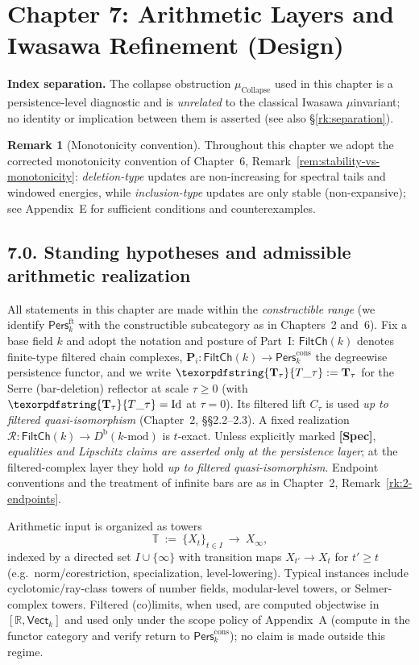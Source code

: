 \documentclass[11pt]{article}
\DeclareRobustCommand{\hyp}{\nobreakdash-}
\newcommand{\Pers}{\mathsf{Pers}}
\newcommand{\Rfun}{\mathcal{R}}
\numberwithin{equation}{section}
\theoremstyle{definition}
\newtheorem{remark}[theorem]{Remark}
\DeclareRobustCommand{\FiltCh}[1]{\mathsf{FiltCh}(#1)}
\DeclareRobustCommand{\Ttau}{\texorpdfstring{\ensuremath{\mathbf{T}_{\tau}}}{T\_\tau}}
\DeclareRobustCommand{\muc}{\mu_{\mathrm{Collapse}}}
\begin{document}
\section{Chapter 7: Arithmetic Layers and Iwasawa Refinement (Design)}

\noindent\textbf{Index separation.} The collapse obstruction \(\muc\) used in this chapter is a persistence\hyp level diagnostic and is \emph{unrelated} to the classical Iwasawa \(\mu\)\nobreakdash invariant; no identity or implication between them is asserted (see also §\ref{rk:separation}).

\begin{remark}[Monotonicity convention]
Throughout this chapter we adopt the corrected monotonicity convention of
Chapter~6, Remark~\ref{rem:stability-vs-monotonicity}:
\emph{deletion\hyp type} updates are non\hyp increasing for spectral tails and windowed energies,
while \emph{inclusion\hyp type} updates are only stable (non\hyp expansive);
see Appendix~E for sufficient conditions and counterexamples.
\end{remark}

\subsection*{7.0. Standing hypotheses and admissible arithmetic realization}
All statements in this chapter are made within the \emph{constructible range}
(we identify \(\Pers^{\mathrm{ft}}_k\) with the constructible subcategory as in Chapters~2 and~6).
Fix a base field \(k\) and adopt the notation and posture of Part~I:
\(\FiltCh{k}\) denotes finite\hyp type filtered chain complexes,
\(\mathbf{P}_i:\FiltCh{k}\to\Pers^{\mathrm{cons}}_k\) the degreewise persistence functor,
and we write \(\Ttau:=\mathbf{T}_\tau\) for the Serre (bar\hyp deletion) reflector at scale \(\tau\ge 0\) (with \(\Ttau=\mathrm{Id}\) at \(\tau=0\)).
Its filtered lift \(C_\tau\) is used \emph{up to filtered quasi\hyp isomorphism} (Chapter~2, §§2.2–2.3).
A fixed realization \(\Rfun:\FiltCh{k}\to D^{\mathrm{b}}(k\text{-mod})\) is \(t\)\hyp exact.
Unless explicitly marked \textbf{[Spec]}, \emph{equalities and Lipschitz claims are asserted only at the persistence layer};
at the filtered\hyp complex layer they hold \emph{up to filtered quasi\hyp isomorphism}.
Endpoint conventions and the treatment of infinite bars are as in Chapter~2, Remark~\ref{rk:2-endpoints}.

Arithmetic input is organized as towers
\[
  \mathbb{T}\ :=\ \{X_t\}_{t\in I}\ \longrightarrow\ X_\infty,
\]
indexed by a directed set \(I\cup\{\infty\}\) with transition maps \(X_{t'}\to X_t\) for \(t'\ge t\) (e.g.\ norm/corestriction, specialization, level\hyp lowering).
Typical instances include cyclotomic/ray\hyp class towers of number fields, modular\hyp level towers, or Selmer\hyp complex towers.
Filtered (co)limits, when used, are computed objectwise in \([\mathbb{R},\mathsf{Vect}_k]\) and used only under the scope policy of Appendix~A (compute in the functor category and verify return to \(\Pers^{\mathrm{cons}}_k\)); no claim is made outside this regime.
\end{document}
